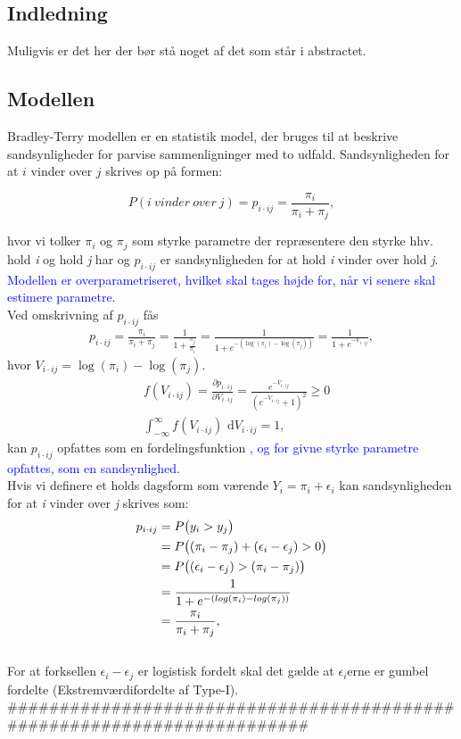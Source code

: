 \documentclass[11pt,a4paper]{article}
\begin{document}
\subsection{Indledning}
Muligvis er det her der bør stå noget af det som står i abstractet. 
\subsection{Modellen}
Bradley-Terry modellen er en statistik model, der bruges til at beskrive sandsynligheder for parvise sammenligninger med to udfald. Sandsynligheden for at $i$ vinder over $j$ skrives op på formen: 

\begin{equation}
P(i\ vinder\ over\ j) = p_{i\cdot ij} = \frac{\pi_i}{\pi_i+\pi_j},
\end{equation}

hvor vi tolker $\pi_i$ og $\pi_j$ som styrke parametre der repræsentere den styrke hhv. hold \textit{i} og hold \textit{j} har og $p_{i\cdot ij}$ er sandsynligheden for at hold \textit{i} vinder over hold \textit{j}.
\textcolor{blue}{Modellen er overparametriseret, hvilket skal tages højde for, når vi senere skal estimere parametre.}\\
Ved omskrivning af $p_{i\cdot ij}$ fås
\begin{align}
    
    p_{i\cdot ij} = \frac{\pi_i}{\pi_i+\pi_j}=\frac{1}{1+\frac{\pi_j}{\pi_i}}=\frac{1}{1+e^{-(\log(\pi_i)-\log(\pi_j))}}=\frac{1}{1+e^{-V_{i\cdot ij}}},   
\end{align}
hvor $V_{i\cdot ij}=\log(\pi_i)-\log(\pi_j)$.
\begin{align}
&f(V_{i\cdot ij})=\frac{\partial p_{i\cdot ij}}{\partial V_{i\cdot ij}}= \frac{e^{-V_{i\cdot ij}}}{(e^{-V_{i\cdot ij}}+1)^2} \geq 0 \\
&\int_{-\infty}^\infty f(V_{i\cdot ij}) \text{  d} V_{i\cdot ij} = 1,
\end{align}
kan $p_{i\cdot ij}$ opfattes som en fordelingsfunktion \textcolor{blue}{, og for givne styrke parametre opfattes, som en sandsynlighed.}\\ Hvis vi definere et holds dagsform som værende $Y_i=\pi_i+\epsilon_i$ kan sandsynligheden for at \textit{i} vinder over \textit{j} skrives som:
\begin{align*}
p_{i\cdot ij}&=P\big{(}y_i>y_j\big{)}
\\&=P\big{(}(\pi_i-\pi_j)+(\epsilon_i-\epsilon_j)>0\big{)}
\\&=P\big{(}(\epsilon_i-\epsilon_j)>(\pi_i-\pi_j)\big{)}
\\&=\frac{1}{1+e^{-(log(\pi_i)-log(\pi_j))}} 
\\&=\frac{\pi_i}{\pi_i+\pi_j},\;\;
\end{align*}
\\
For at forksellen $\epsilon_i-\epsilon_j$ er logistisk fordelt skal det gælde at $\epsilon_i$erne er gumbel fordelte (Ekstremværdifordelte af Type-I).
\clearpage
########################################################################
\end{document}
